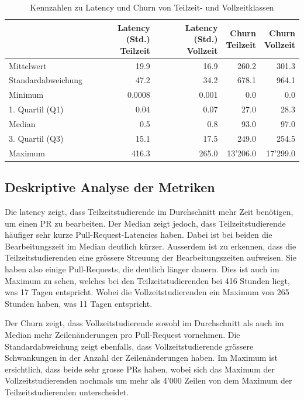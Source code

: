 \begin{table}[htbp]
    \centering
    \caption{Kennzahlen zu Latency und Churn von Teilzeit- und Vollzeitklassen}
    \begin{tabular}{@{}lrrrr@{}}
        \toprule
        \makecell{}&
        \makecell{\textbf{Latency (Std.)} \\ \textbf{Teilzeit}}&
        \makecell{\textbf{Latency (Std.)} \\ \textbf{Vollzeit}}&
        \makecell{\textbf{Churn} \\ \textbf{Teilzeit}}&
        \makecell{\textbf{Churn} \\ \textbf{Vollzeit}}\\
        \midrule
        Mittelwert & 19.9 & 16.9 & 260.2 & 301.3 \\
        Standardabweichung &  47.2 & 34.2  & 678.1 & 964.1 \\
        Minimum & 0.0008 & 0.001 & 0.0 & 0.0 \\
        1. Quartil (Q1) & 0.04 & 0.07 & 27.0 & 28.3\\
        Median & 0.5 & 0.8 & 93.0 & 97.0 \\
        3. Quartil (Q3) &  15.1 & 17.5 & 249.0 & 254.5 \\
        Maximum & 416.3 & 265.0 & 13'206.0 & 17'299.0 \\
        \bottomrule
    \end{tabular}
    \label{tab:deskriptive-kennzahlen-teilzeit-vollzeit}
\end{table}


\subsection{Deskriptive Analyse der Metriken}
Die latency zeigt, dass Teilzeitstudierende im Durchschnitt mehr Zeit benötigen, um einen PR zu bearbeiten. Der Median zeigt jedoch, dass Teilzeitstudierende häufiger sehr kurze Pull-Request-Latencies haben. Dabei ist bei beiden die Bearbeitungszeit im Median deutlich kürzer. Ausserdem ist zu erkennen, dass die Teilzeitstudierenden eine grössere Streuung der Bearbeitungszeiten aufweisen. Sie haben also einige Pull-Requests, die deutlich länger dauern. Dies ist auch im Maximum zu sehen, welches bei den Teilzeitstudierenden bei 416 Stunden liegt, was 17 Tagen entspricht. Wobei die Vollzeitstudierenden ein Maximum von 265 Stunden haben, was 11 Tagen entspricht.

Der Churn zeigt, dass Vollzeitstudierende sowohl im Durchschnitt als auch im Median mehr Zeilenänderungen pro Pull-Request vornehmen. Die Standardabweichung zeigt ebenfalls, dass Vollzeitstudierende grössere Schwankungen in der Anzahl der Zeilenänderungen haben. Im Maximum ist ersichtlich, dass beide sehr grosse PRs haben, wobei sich das Maximum der Vollzeitstudierenden nochmals um mehr als 4'000 Zeilen von dem Maximum der Teilzeitstudierenden unterscheidet.

